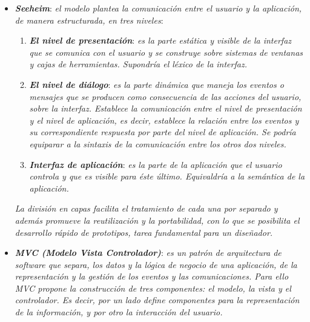 \documentclass[11pt,oneside]{book}
\begin{document}
\begin{itemize}
\item \textit{\textbf{Seeheim}}: \textit{el modelo plantea la comunicación entre el usuario y la aplicación, de manera estructurada, en tres niveles}:
\begin{enumerate}
\item \textit{\textbf{El nivel de presentación}}: \textit{es la parte estática y visible de la interfaz que se comunica con el usuario y se construye sobre sistemas de ventanas y cajas de herramientas. Supondría el léxico de la interfaz.}

\item \textit{\textbf{El nivel de diálogo}}: \textit{es la parte dinámica que maneja los eventos o mensajes que se producen como consecuencia de las acciones del usuario, sobre la interfaz. Establece la comunicación entre el nivel de presentación y el nivel de aplicación, es decir, establece la relación entre los eventos y su correspondiente respuesta por parte del nivel de aplicación. Se podría equiparar a la sintaxis de la comunicación entre los otros dos niveles.}

\item \textit{\textbf{Interfaz de aplicación}}: \textit{es la parte de la aplicación que el usuario controla y que es visible para éste último. Equivaldría a la semántica de la aplicación.}
\end{enumerate}

\textit{La división en capas facilita el tratamiento de cada una por separado y además promueve la reutilización y la portabilidad, con lo que se posibilita el desarrollo rápido de prototipos, tarea fundamental para un diseñador.}

\item \textit{\textbf{MVC (Modelo Vista Controlador)}}: \textit{es un patrón de arquitectura de software que separa, los datos y la lógica de negocio de una aplicación, de la representación y la gestión de los eventos y las comunicaciones. Para ello MVC propone la construcción de tres componentes: el \textit{modelo}, la \textit{vista} y el \textit{controlador}. Es decir, por un lado define componentes para la representación de la información, y por otro la interacción del usuario.}


\end{itemize}
\end{document}

